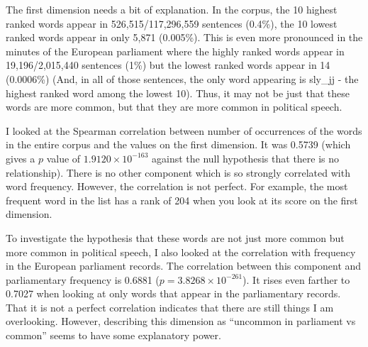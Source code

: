 \documentclass[eric_thesis.tex]{subfiles}
\begin{document}
The first dimension needs a bit of explanation. In the corpus, the 10 highest 
ranked words appear in 526,515/117,296,559 sentences (0.4\%), the 10 lowest 
ranked words appear in only 5,871 (0.005\%). This is even more pronounced in the 
minutes of the European parliament where the highly ranked words appear in 
19,196/2,015,440 sentences (1\%) but the lowest ranked words appear in 14 
(0.0006\%) (And, in all of those sentences, the only word appearing is 
sly\_jj - the highest ranked word among the lowest 10). Thus, it may not be 
just that these words are more common, but that they are more common in 
political speech.

I looked at the Spearman correlation between number of occurrences of the words 
in the entire corpus and the values on the first dimension. It was 0.5739 
(which gives a $p$ value of $1.9120 \times 10^{-163}$ against the null hypothesis 
that there is no relationship). There is no other component which is so 
strongly correlated with word frequency. However, the correlation is not 
perfect. For example, the most frequent word in the list has a rank of 204 when 
you look at its score on the first dimension.

To investigate the hypothesis that these words are not just more common but 
more common in political speech, I also looked at the correlation with 
frequency in the European parliament records. The correlation between this 
component and parliamentary frequency is 0.6881 
($p=3.8268 \times 10^{-261}$).  It rises even farther to 0.7027 when looking 
at only words that appear in the 
parliamentary records. That it is not a perfect correlation indicates that 
there are still things I am overlooking. However, describing this dimension as 
``uncommon in parliament vs common'' seems to have some explanatory power.
\end{document}
